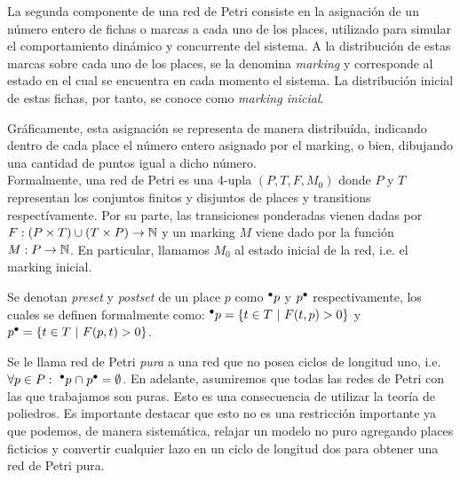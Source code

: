 La segunda componente de una red de Petri consiste en la asignación
de un número entero de fichas o marcas a cada uno de los places, 
utilizado para simular el comportamiento dinámico y concurrente del sistema.
A la distribución de estas marcas sobre cada uno de los places, se la denomina
\textit{marking} y corresponde al estado en el cual se encuentra en cada momento el sistema.
La distribución inicial de estas fichas, por tanto, se conoce como \textit{marking inicial}.

Gráficamente, esta asignación se representa de manera distribuída, indicando dentro 
de cada place el número entero asignado por el marking, o bien, dibujando una 
cantidad de puntos igual a dicho número.
\\

Formalmente, una red de Petri es una 4-upla $(P,T,F,M_0)$ donde $P$ y $T$\footnotemark[1]
representan los conjuntos finitos y disjuntos de places y transitions respectívamente.
Por su parte, las transiciones ponderadas vienen dadas por \mbox{$F:(P \times T) \cup (T \times P)  \to \mathbb{N}$}
y un marking $M$ viene dado por la función \mbox{$M:P \to \mathbb{N}$}.
En particular, llamamos $M_0$ al estado inicial de la red, i.e. el marking inicial.


Se denotan \textit{preset} y \textit{postset} de un place $p$ como $\mbox{$^\bullet p$}$ y $\mbox{$p^\bullet$}$ respectivamente,
los cuales se definen formalmente como: $\mbox{$^\bullet p$} =  \{t \in T ~|~ F(t,p) > 0 \}$
y $\mbox{$p^\bullet$} = \{t \in T ~|~ F(p,t) > 0 \}$.

Se le llama red de Petri \emph{pura} a una red que no posea ciclos de longitud uno, i.e.
$\forall p \in P:~ {\mbox{$^\bullet p$}} \mathrel{\cap} {\mbox{$p^\bullet$}} = \emptyset$.
En adelante, asumiremos que todas las redes de Petri con las que trabajamos son puras.
Esto es una consecuencia de utilizar la teoría de poliedros. Es importante destacar que esto no es una 
restricción importante ya que podemos, de manera sistemática, relajar un modelo no puro agregando
places ficticios y convertir cualquier lazo en un ciclo de longitud dos para obtener una red de Petri pura.
\\

